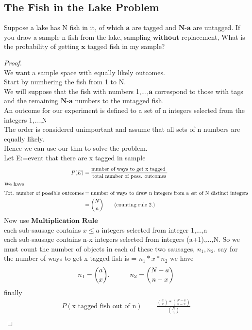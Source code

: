 \documentclass[11pt]{article}
\newcommand\tab[1][1cm]{\hspace*{#1}}
\begin{document}
        \subsection{The Fish in the Lake Problem}
            Suppose a lake has N fish in it, of which $\textbf{a}$ are tagged and $\textbf{N-a}$ are untagged.
            If you draw a sample n fish from the lake, sampling $\textbf{without}$ replacement,
            What is the probability of getting $\textbf{x}$ tagged fish in my sample?\\
            \begin{proof}\tab
                \\We want a sample space with equally likely outcomes. 
                \\Start by numbering the fish from 1 to N.
                \\We will suppose that the fish with numbers 1,...,$\textbf{a}$ correspond to those with tags and 
                the remaining $\textbf{N-a}$ numbers to the untagged fish.
                \\An outcome for our experiment is defined to a set of n integers selected from the integers 1,...,N
                \\The order is considered unimportant and assume that all sets of n numbers are equally likely.
                \\Hence we can use our thm to solve the problem. 
                \\Let E:=event that there are x tagged in sample 
                \begin{align*}
                    P(E) & = \frac{\text{number of ways to get x tagged }}{\text{total number of poss. outcomes}} \\
                    \intertext{We have }
                    \text{Tot. number of possible outcomes} &= \text{number of ways to draw n integers from a set of N distinct integers}\\
                                                            & = \binom{N}{n} \tag{counting rule 2.}    
                \end{align*}
                Now use $\textbf{Multiplication Rule}$
                \\each sub-sausage contains $x\leq a$ integers selected from integer 1,...,a  
                \\each sub-sausage contains n-x integers selected from integers (a+1),...,N.
                So we must count the number of objects in each of these two sausages, $n_1, n_2$. 
                say for the number of ways to get x tagged fish is = $n_1*x*n_2$
                we have \[n_1 = \binom{a}{x}, \tab 
                        n_2 = \binom{N-a}{n-x}\]
                finally 
                \begin{align*}
                    P(\text{x tagged fish out of n})    &= \frac{\binom{a}{x}*\binom{N-a}{n-x}}{\binom{N}{n}}\\
                \end{align*}
            \end{proof}
\end{document}
